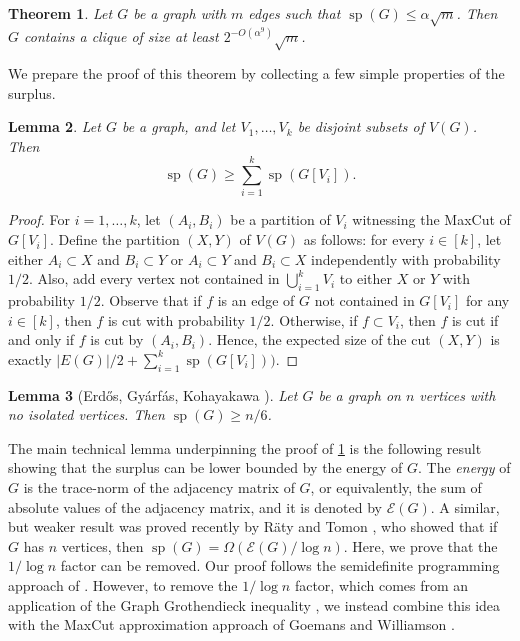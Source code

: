 \documentclass[11pt]{amsart}
\theoremstyle{plain}
\newtheorem{theorem}{Theorem}[section]
\newtheorem{lemma}[theorem]{Lemma}
\theoremstyle{definition}
\DeclareMathOperator{\surp}{sp}
\begin{document}
\begin{theorem}\label{thm:main_maxcut}
Let $G$ be a  graph with $m$ edges such that $\surp(G)\leq \alpha \sqrt{m}$. Then $G$ contains a clique of size at least $2^{-O(\alpha^9)}\sqrt{m}$.
\end{theorem}

We prepare the proof of this theorem by collecting a few simple properties of the surplus.

\begin{lemma}\label{lemma:surplus_sum}
Let $G$ be a graph, and let $V_1,\dots,V_k$ be disjoint subsets of $V(G)$. Then
$$\surp(G)\geq \sum_{i=1}^k\surp(G[V_i]).$$
\end{lemma}

\begin{proof}
For $i=1,\dots,k$, let $(A_i,B_i)$ be a partition of $V_i$ witnessing the MaxCut of $G[V_i]$. Define the partition $(X,Y)$ of $V(G)$ as follows: for every $i\in [k]$, let either $A_i\subset X$ and $B_i\subset Y$ or $A_i\subset Y$ and $B_i\subset X$ independently with probability $1/2$. Also, add every vertex not contained in $\bigcup_{i=1}^k V_i$ to either $X$ or $Y$ with probability $1/2$. Observe that if $f$ is an edge of $G$ not contained in $G[V_i]$ for any $i\in [k]$, then $f$ is cut with probability $1/2$. Otherwise, if $f\subset V_i$, then $f$ is cut if and only if $f$ is cut by $(A_i,B_i)$. Hence, the expected size of the cut $(X,Y)$ is exactly $|E(G)|/2+\sum_{i=1}^k \surp(G[V_i]))$.
\end{proof}


\begin{lemma}[Erd\H{o}s, Gy\'arf\'as, Kohayakawa \cite{EGyK97}]\label{lemma:surp_n}
Let $G$ be a graph on $n$ vertices with no isolated vertices. Then $\surp(G)\geq n/6$.
\end{lemma}

The main technical lemma underpinning the proof of \cref{thm:main_maxcut} is the following result showing that the surplus can be lower bounded by the energy of $G$. The \emph{energy} of $G$ is the trace-norm of the adjacency matrix of $G$, or equivalently, the sum of absolute values of the adjacency matrix, and it is denoted by $\mathcal{E}(G)$.  A similar, but weaker result was proved recently by R\"aty and Tomon \cite{RatyTomon}, who showed that if $G$ has $n$ vertices, then $\surp(G)=\Omega(\mathcal{E}(G)/\log n)$. Here, we prove that the $1/\log n$ factor can be removed. Our proof follows the semidefinite programming approach of \cite{RatyTomon}. However, to remove the $1/\log n$ factor, which comes from an application of the Graph Grothendieck inequality \cite{AMMN}, we instead combine this idea with the MaxCut approximation approach of Goemans and Williamson \cite{GoemansWilliamson}. 
\end{document}
